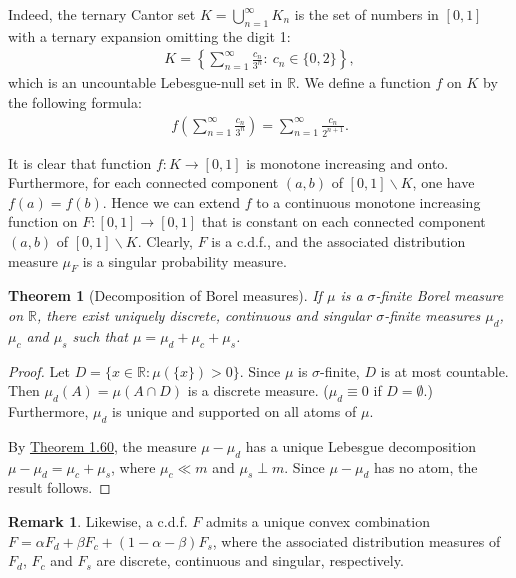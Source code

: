 \documentclass{article}
\numberwithin{equation}{section}
\theoremstyle{plain}
\newtheorem{theorem}{Theorem}[section]
\theoremstyle{definition}
\newtheorem*{remark}{Remark}
\begin{document}
Indeed, the ternary Cantor set $K=\bigcup_{n=1}^\infty K_n$ is the set of numbers
in $[0,1]$ with a ternary expansion omitting the digit 1:
\begin{align*}
	K = \left\{\sum_{n=1}^\infty \frac{c_n}{3^n}:\ c_n\in\{0,2\}\right\},
\end{align*}
which is an uncountable Lebesgue-null set in $\mathbb{R}$. We define a function $f$ on $K$ by the following formula:
\begin{align*}
	f\left(\sum_{n=1}^\infty \frac{c_n}{3^n}\right) = \sum_{n=1}^\infty \frac{c_n}{2^{n+1}}.\tag{Devil's stair}
\end{align*}

It is clear that function $f:K\to[0,1]$ is monotone increasing and onto. Furthermore, for each connected component $(a,b)$ of $[0,1]\backslash K$, one have $f(a)=f(b)$. Hence we can extend $f$ to a continuous monotone increasing function on $F:[0,1]\to[0,1]$ that is constant on each connected component $(a,b)$ of $[0,1]\backslash K$. Clearly, $F$ is a c.d.f., and the associated distribution measure $\mu_F$ is a singular probability measure.

\begin{theorem}[Decomposition of Borel measures]\label{thm:2.5} If $\mu$ is a $\sigma$-finite Borel measure on $\mathbb{R}$, there exist uniquely discrete, continuous and singular $\sigma$-finite measures $\mu_d$, $\mu_c$ and $\mu_s$ such that $\mu=\mu_d+\mu_c+\mu_s$.
\end{theorem}
\begin{proof}
Let $D=\{x\in\mathbb{R}:\mu(\{x\})>0\}$. Since $\mu$ is $\sigma$-finite, $D$ is at most countable. Then $\mu_d(A)=\mu(A\cap D)$ is a discrete measure. ($\mu_d\equiv 0$ if $D=\emptyset$.) Furthermore, $\mu_d$ is unique and supported on all atoms of $\mu$.

By \hyperref[thm:1.60]{Theorem 1.60}, the measure $\mu-\mu_d$ has a unique Lebesgue decomposition $\mu-\mu_d=\mu_c+\mu_s$, where $\mu_c\ll m$ and $\mu_s\perp m$. Since $\mu-\mu_d$ has no atom, the result follows.
\end{proof}

\begin{remark} Likewise, a c.d.f. $F$ admits a unique convex combination $F=\alpha F_d + \beta F_c + (1-\alpha-\beta)F_s$, where the associated distribution measures of $F_d$, $F_c$ and $F_s$ are discrete, continuous and singular, respectively.
\end{remark}
\end{document}
